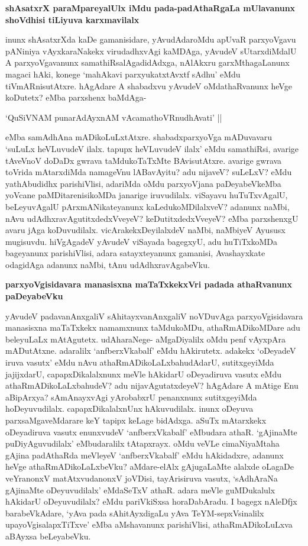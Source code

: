 {\bigskip
\noindent
{\large\bf shAsatxrX paraMpareyalUlx iMdu pada-padAthaRgaLa mUlavanunx shoVdhisi tiLiyuva karxmavilalx}}\label{page216}
\medskip

\noindent
inunx shAsatxrXda kaDe gamanisidare, yAvudAdaroMdu apUvaR parxyoVgavu pANiniya vAyxkaraNakekx virudadhxvAgi kaMDAga, yAvudeV sUtarxdiMdalU A parxyoVgavanunx samathiRsalAgadidAdxga, nAlAkxru garxMthagaLanunx magaci hAki, konege `mahAkavi parxyukatxtAvxtf sAdhu'\label{216} eMdu tiVmARnisutAtxre. hAgAdare A shabadxvu yAvudeV oMdathaRvanunx heVge koDutetx? eMba parxshenx baMdAga-

\begin{shloka}
`QuSiVNAM punarAdAyxnAM vAcamathoVRnudhAvati' ||\label{216a}
\end{shloka}

\noindent
eMba samAdhAna mADikoLuLxtAtxre. shabadxparxyoVga mADuvavaru `suLuLx heVLuvudeV ilalx. tapupx heVLuvudeV ilalx' eMdu samathiRsi, avarige tAveVnoV doDaDx gwrava taMdukoTaTxMte BAvisutAtxre. avarige gwrava toVrida mAtarxdiMda namageVnu lABavAyitu? adu nijaveV? suLeLxV? eMdu yathAbudidhx parishiVlisi, adariMda oMdu parxyoVjana paDeyabeVkeMba yoVcane paMDitarenisikoMDa janarige iruvudilalx. viSayavu huTuTxvAgalU, beLeyuvAgalU pArxmANikateyanunx kaLedukoMDilalxveV? adanunx naMbi, nAvu udAdhxravAgutitxdedxVveyeV? keDutitxdedxVveyeV? eMba parxshenxgU avaru jAga koDuvudilalx. vicArakekxDeyilalxdeV naMbi, naMbiyeV Ayususx mugisuvdu. hiVgAgadeV yAvudeV viSayada bagegxyU, adu huTiTxkoMDa bageyanunx parishiVlisi, adara satayxteyanunx gamanisi, Avashayxkate odagidAga adanunx naMbi, tAnu udAdhxravAgabeVku.

{\bigskip
\noindent
{\large\bf parxyoVgisidavara manasisxna maTaTxkekxVri padada athaRvanunx paDeyabeVku}}\label{page216a}
\medskip

\noindent
yAvudeV padavanAnxgaliV sAhitayxvanAnxgaliV noVDuvAga parxyoVgisidavara manasisxna maTaTxkekx namamxnunx taMdukoMDu, athaRmADikoMDare adu beleyuLaLx mAtAgutetx. udAharaNege- aMgaDiyalilx oMdu penf vAyxpAra mADutAtxne. adaralilx `anfberxVkabalf' eMdu hAkirutetx. adakekx `oDeyadeV iruva vasutx' eMdu nAvu athaRmADikoLaLxbahudAdarU, sutitxgeyiMda jajijxdarU, capapxDikalalxnunx meVle hAkidarU oDeyadiruva vasutx eMdu athaRmADikoLaLxbahudeV? adu nijavAgutatxdeyeV? hAgAdare A mAtige Enu aBipArxya? sAmAnayxvAgi yArobabxrU penanxnunx sutitxgeyiMda hoDeyuvudilalx. capapxDikalalxnUnx hAkuvudilalx. inunx oDeyuva parxsaMgaveMdarare keY tapipx keLage bidAdxga. aSuTx mAtarxkekx oDeyadiruva vasutx enunxvudeV `anfberxVkabalf' eMbudara athaR. `gAjinaMte puDiyAguvudilalx' eMbudaralilx tAtapxrayx. oMdu veVLe cimaNiyaMtaha gAjina padAthaRda meVleyeV `anfberxVkabalf' eMdu hAkidadxre, adanunx heVge athaRmADikoLaLxbeVku? aMdare-elAlx gAjugaLaMte alalxde oLagaDe veYranonxV matAtxvudanonxV joVDisi, tayArisiruva vasutx, `sAdhAraNa gAjinaMte oDeyuvudilalx' eMdaSeTxV athaR. adara meVle guMDukalulx hAkidarU oDeyuvudilalx? eMdu pariVkiSxsa horaDabAradu. I bagegx nAleDfjx barabeVkAdare, `yAva pada sAhitAyxdigaLu yAva TeYM-sepxVsinalilx upayoVgisalapxTiTxve' eMba aMshavanunx parishiVlisi, athaRmADikoLuLxva aBAyxsa beLeyabeVku.

